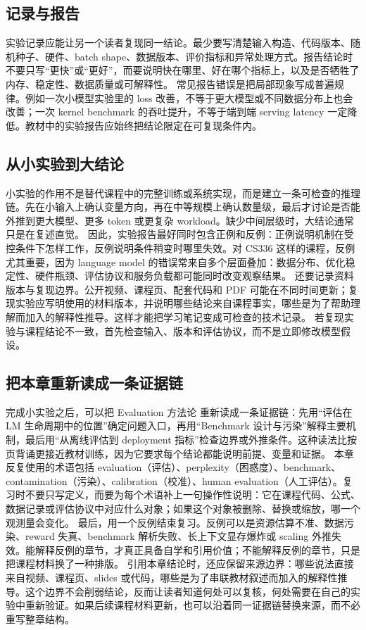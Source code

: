 \documentclass[a4paper]{article}
\begin{document}
\subsection{记录与报告}
实验记录应能让另一个读者复现同一结论。最少要写清楚输入构造、代码版本、随机种子、硬件、batch shape、数据版本、评价指标和异常处理方式。报告结论时不要只写“更快”或“更好”，而要说明快在哪里、好在哪个指标上，以及是否牺牲了内存、稳定性、数据质量或可解释性。
常见报告错误是把局部现象写成普遍规律。例如一次小模型实验里的 loss 改善，不等于更大模型或不同数据分布上也会改善；一次 kernel benchmark 的吞吐提升，不等于端到端 serving latency 一定降低。教材中的实验报告应始终把结论限定在可复现条件内。
\subsection{从小实验到大结论}
小实验的作用不是替代课程中的完整训练或系统实现，而是建立一条可检查的推理链。先在小输入上确认变量方向，再在中等规模上确认数量级，最后才讨论是否能外推到更大模型、更多 token 或更复杂 workload。缺少中间层级时，大结论通常只是在复述直觉。
因此，实验报告最好同时包含正例和反例：正例说明机制在受控条件下怎样工作，反例说明条件稍变时哪里失效。对 CS336 这样的课程，反例尤其重要，因为 language model 的错误常来自多个层面叠加：数据分布、优化稳定性、硬件瓶颈、评估协议和服务负载都可能同时改变观察结果。
还要记录资料版本与复现边界。公开视频、课程页、配套代码和 PDF 可能在不同时间更新；复现实验应写明使用的材料版本，并说明哪些结论来自课程事实，哪些是为了帮助理解而加入的解释性推导。这样才能把学习笔记变成可检查的技术记录。
若复现实验与课程结论不一致，首先检查输入、版本和评估协议，而不是立即修改模型假设。
\subsection{把本章重新读成一条证据链}
完成小实验之后，可以把 Evaluation 方法论 重新读成一条证据链：先用“评估在 LM 生命周期中的位置”确定问题入口，再用“Benchmark 设计与污染”解释主要机制，最后用“从离线评估到 deployment 指标”检查边界或外推条件。这种读法比按页背诵更接近教材训练，因为它要求每个结论都能说明前提、变量和证据。
本章反复使用的术语包括 evaluation（评估）、perplexity（困惑度）、benchmark、contamination（污染）、calibration（校准）、human evaluation（人工评估）。复习时不要只写定义，而要为每个术语补上一句操作性说明：它在课程代码、公式、数据记录或评估协议中对应什么对象；如果这个对象被删除、替换或缩放，哪一个观测量会变化。
最后，用一个反例结束复习。反例可以是资源估算不准、数据污染、reward 失真、benchmark 解析失败、长上下文显存爆炸或 scaling 外推失效。能解释反例的章节，才真正具备自学和引用价值；不能解释反例的章节，只是把课程材料换了一种排版。
引用本章结论时，还应保留来源边界：哪些说法直接来自视频、课程页、slides 或代码，哪些是为了串联教材叙述而加入的解释性推导。这个边界不会削弱结论，反而让读者知道何处可以复核，何处需要在自己的实验中重新验证。如果后续课程材料更新，也可以沿着同一证据链替换来源，而不必重写整章结构。
\end{document}
